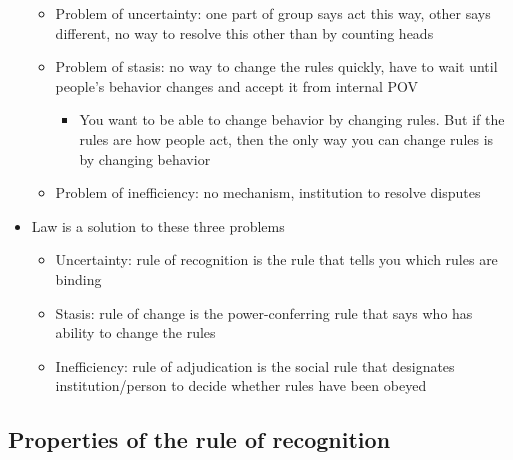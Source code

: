 \begin{itemize}
  \begin{itemize}
  \tightlist
  \item
    Problem of uncertainty: one part of group says act this way, other
    says different, no way to resolve this other than by counting heads
  \item
    Problem of stasis: no way to change the rules quickly, have to wait
    until people's behavior changes and accept it from internal POV

    \begin{itemize}
    \tightlist
    \item
      You want to be able to change behavior by changing rules. But if
      the rules are how people act, then the only way you can change
      rules is by changing behavior
    \end{itemize}
  \item
    Problem of inefficiency: no mechanism, institution to resolve
    disputes
  \end{itemize}
\item
  Law is a solution to these three problems

  \begin{itemize}
  \tightlist
  \item
    Uncertainty: rule of recognition is the rule that tells you which
    rules are binding
  \item
    Stasis: rule of change is the power-conferring rule that says who
    has ability to change the rules
  \item
    Inefficiency: rule of adjudication is the social rule that
    designates institution/person to decide whether rules have been
    obeyed
  \end{itemize}
\end{itemize}

\hypertarget{properties-of-the-rule-of-recognition}{%
\subsection{Properties of the rule of
recognition}\label{properties-of-the-rule-of-recognition}}


